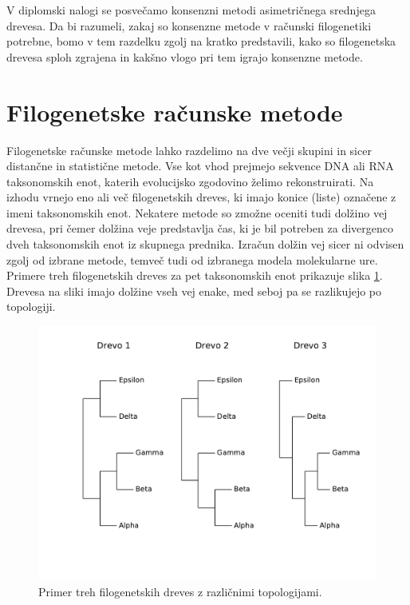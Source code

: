 \documentclass[a4paper, 12pt]{book}
\begin{document}
V diplomski nalogi se posvečamo konsenzni metodi asimetričnega srednjega drevesa. Da bi 
razumeli, zakaj so konsenzne metode v računski filogenetiki potrebne, bomo v tem 
razdelku zgolj na kratko predstavili, kako so filogenetska drevesa sploh zgrajena in 
kakšno vlogo pri tem igrajo konsenzne metode. 

\section{Filogenetske računske metode}

Filogenetske računske metode lahko razdelimo na dve večji skupini in sicer distančne in
statistične metode. Vse kot vhod prejmejo sekvence DNA ali RNA taksonomskih enot, 
katerih evolucijsko zgodovino želimo rekonstruirati. Na izhodu vrnejo eno ali
več filogenetskih dreves, ki imajo konice (liste) označene z imeni taksonomskih enot.
Nekatere metode so zmožne oceniti tudi dolžino vej drevesa, pri čemer dolžina veje
predstavlja čas, ki je bil potreben za divergenco dveh taksonomskih enot iz skupnega
prednika. Izračun dolžin vej sicer ni odvisen zgolj od izbrane metode, temveč tudi 
od izbranega modela molekularne ure. Primere treh filogenetskih dreves za pet 
taksonomskih enot prikazuje slika \ref{img-input-trees}. Drevesa na sliki imajo 
dolžine vseh vej enake, med seboj pa se razlikujejo po topologiji.

\begin{figure}
	\begin{center}
		\includegraphics[scale=0.7, clip=true, trim=0 3cm 0 9mm]{gfx/input_trees_ex.pdf}
	\end{center}
	\caption{Primer treh filogenetskih dreves z različnimi topologijami.}
	\label{img-input-trees}
\end{figure}
\end{document}
